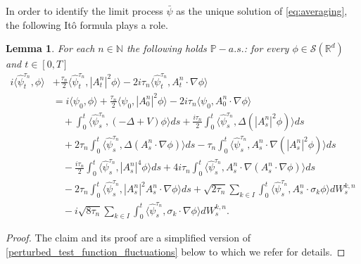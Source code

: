 \documentclass[a4paper,10pt]{amsart}
\newcommand{\R}{\mathbb{R}}
\newtheorem{lemma}[theorem]{Lemma}
\theoremstyle{remark}
\numberwithin{equation}{section}
\begin{document}
In order to identify the limit process $\bar{\psi}$ as the unique solution of \eqref{eq:averaging}, the following It\^o formula plays a role. 
\begin{lemma}\label{perturbed_test_function_averaging}
For each $n\in\mathbb N$ the following holds $\mathbb{P}-a.s.$: for every
$\phi\in \mathscr{S}(\R^d)$ and $t\in [0,T]$
\begin{align*}
    i\langle \hat{\psi}^{\tau_n}_t, \phi\rangle
    &+\frac{\tau_n}{2}\langle \hat{\psi}^{\tau_n}_t,|A^n_t|^2\phi\rangle
    -2i\tau_n\langle \hat{\psi}^{\tau_n}_t,A^n_t\cdot\nabla\phi\rangle\\
    &=i\langle \psi_0,\phi\rangle
    +\frac{\tau_n}{2}\langle \psi_0,|A^n_0|^2\phi\rangle
    -2i\tau_n\langle \psi_0,A^n_0\cdot\nabla\phi\rangle\\
    &\quad+\int_0^t\langle\hat{\psi}^{\tau_n}_s,(-\Delta+V)\phi\rangle ds+\frac{i\tau_n}{2}\int_0^t
    \langle\hat{\psi}^{\tau_n}_s,\Delta(|A^n_s|^2\phi)\rangle ds\\
    &\quad+2\tau_n\int_0^t
    \langle\hat{\psi}^{\tau_n}_s,\Delta(A^n_s\cdot\nabla\phi)\rangle ds-\tau_n\int_0^t
    \langle\hat{\psi}^{\tau_n}_s,A^n_s\cdot\nabla(|A^n_s|^2\phi)\rangle ds\\
    &\quad-\frac{i\tau_n}{2}\int_0^t
    \langle\hat{\psi}^{\tau_n}_s,|A^n_s|^4\phi\rangle ds+4i\tau_n\int_0^t
    \langle\hat{\psi}^{\tau_n}_s,A^n_s\cdot\nabla(A^n_s\cdot\nabla\phi)\rangle ds\\
    &\quad-2\tau_n\int_0^t
    \langle\hat{\psi}^{\tau_n}_s,|A^n_s|^2A^n_s\cdot\nabla\phi\rangle ds+\sqrt{2\tau_n}\sum_{k\in I}\int_0^t
    \langle\hat{\psi}^{\tau_n}_s,A^n_s\cdot\sigma_k\phi\rangle dW^{k,n}_s\\
    &\quad-i\sqrt{8\tau_n}\sum_{k\in I}\int_0^t
    \langle\hat{\psi}^{\tau_n}_s,\sigma_k\cdot\nabla\phi\rangle dW^{k,n}_s.
\end{align*}
\end{lemma}
\begin{proof}
    The claim and its proof are a simplified version of \cref{perturbed_test_function_fluctuations} below to which we refer for details.
\end{proof}
\end{document}
